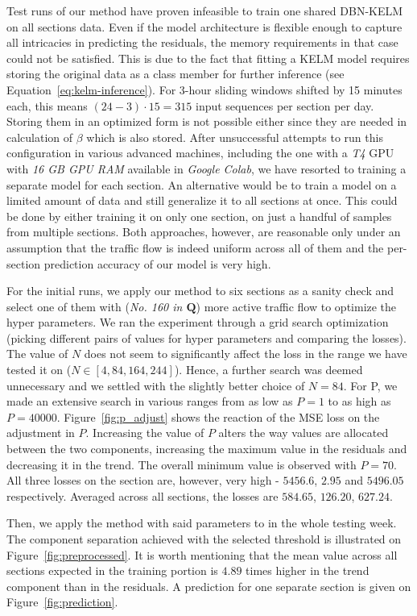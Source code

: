 Test runs of our method have proven infeasible to train one shared DBN-KELM on
all sections data. Even if the model architecture is flexible enough to capture
all intricacies in predicting the residuals, the memory requirements in that
case could not be satisfied. This is due to the fact that fitting a KELM model
requires storing the original data as a class member for further inference (see
Equation~\ref{eq:kelm-inference}). For 3-hour sliding windows shifted by 15
minutes each, this means $(24-3)\cdot15=315$ input sequences per section per
day. Storing them in an optimized form is not possible either since they are
needed in calculation of $\beta$ which is also stored. After unsuccessful
attempts to run this configuration in various advanced machines, including the
one with a \textit{T4} GPU with \textit{16 GB GPU RAM} available in
\textit{Google Colab}, we have resorted to training a separate model for each
section. An alternative would be to train a model on a limited amount of data
and still generalize it to all sections at once. This could be done by either
training it on only one section, on just a handful of samples from multiple
sections. Both approaches, however, are reasonable only under an assumption that
the traffic flow is indeed uniform across all of them and the per-section
prediction accuracy of our model is very high.

For the initial runs, we apply our method to six sections as a sanity check and
select one of them with (\textit{No. 160 in $\mathit{\mathbf{Q}}$}) more active
traffic flow to optimize the hyper parameters. We ran the experiment through a
grid search optimization (picking different pairs of values for hyper parameters
and comparing the losses). The value of $N$ does not seem to significantly
affect the loss in the range we have tested it on ($N\in[4,84,164,244]$). Hence,
a further search was deemed unnecessary and we settled with the slightly better
choice of $N=84$. For P, we made an extensive search in various ranges from as
low as $P=1$ to as high as $P=40000$. Figure~\ref{fig:p_adjust} shows the
reaction of the MSE loss on the adjustment in $P$. Increasing the value of $P$
alters the way values are allocated between the two components, increasing the
maximum value in the residuals and decreasing it in the trend. The overall
minimum value is observed with $P=70$. All three losses on the section are,
however, very high - $5456.6$, $2.95$ and $5496.05$ respectively. Averaged
across all sections, the losses are $584.65$, $126.20$, $627.24$.

Then, we apply the method with said parameters to in the whole testing week. The
component separation achieved with the selected threshold is illustrated on
Figure~\ref{fig:preprocessed}. It is worth mentioning that the mean value
across all sections expected in the training portion is $4.89$ times higher in
the trend component than in the residuals. A prediction for one separate section
is given on Figure~\ref{fig:prediction}.

